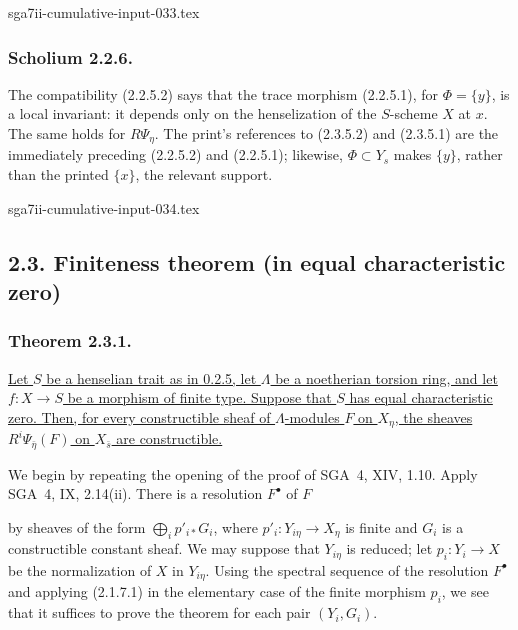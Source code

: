 \begin{filecontents*}{sga7ii-cumulative-input-033.tex}
\subsubsection*{Scholium 2.2.6.}
The compatibility (2.2.5.2) says that the trace morphism (2.2.5.1),
for $\Phi=\{y\}$, is a local invariant: it depends only on the
henselization of the $S$-scheme $X$ at $x$.  The same holds for
$R\Psi_\eta$.  The print's references to (2.3.5.2) and (2.3.5.1) are
the immediately preceding (2.2.5.2) and (2.2.5.1); likewise,
$\Phi\subset Y_s$ makes $\{y\}$, rather than the printed $\{x\}$,
the relevant support.
\end{filecontents*}
\begin{filecontents*}{sga7ii-cumulative-input-034.tex}
\subsection*{2.3. Finiteness theorem (in equal characteristic zero)}

\subsubsection*{Theorem 2.3.1.}
\underline{Let $S$ be a henselian trait as in 0.2.5, let $\Lambda$ be
a noetherian torsion ring, and let $f:X\longrightarrow S$ be a
morphism of finite type.  Suppose that $S$ has equal characteristic
zero.  Then, for every constructible sheaf of $\Lambda$-modules $F$
on $X_\eta$, the sheaves $R^i\Psi_{\bar\eta}(F)$ on $X_{\bar s}$ are
constructible.}

We begin by repeating the opening of the proof of SGA~4, XIV, 1.10.
Apply SGA~4, IX, 2.14(ii).  There is a resolution $F^\bullet$ of $F$
\begin{center}
\end{center}
by sheaves of the form $\bigoplus_i p'_{i*}G_i$, where
$p'_i:Y_{i\eta}\longrightarrow X_\eta$ is finite and $G_i$ is a
constructible constant sheaf.  We may suppose that $Y_{i\eta}$ is
reduced; let $p_i:Y_i\longrightarrow X$ be the normalization of $X$
in $Y_{i\eta}$.  Using the spectral sequence of the resolution
$F^\bullet$ and applying (2.1.7.1) in the elementary case of the
finite morphism $p_i$, we see that it suffices to prove the theorem
for each pair $(Y_i,G_i)$.


\end{filecontents*}
